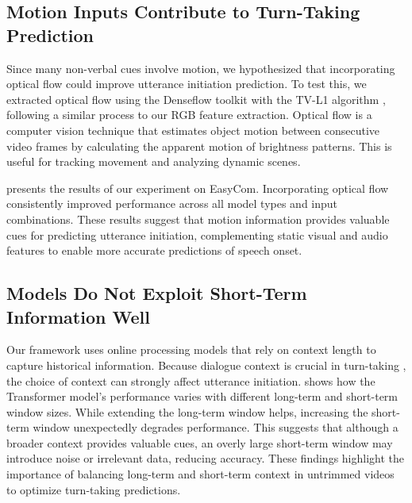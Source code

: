 






\subsection {Motion Inputs Contribute to Turn-Taking Prediction}
Since many non-verbal cues involve motion, we hypothesized that incorporating optical flow could improve utterance initiation prediction.
To test this, we extracted optical flow using the Denseflow toolkit \cite{wang2020denseflow} with the TV-L1 algorithm \cite{zach2007dualityTVL1}, following a similar process to our RGB feature extraction. Optical flow is a computer vision technique that estimates object motion between consecutive video frames by calculating the apparent motion of brightness patterns. This is useful for tracking movement and analyzing dynamic scenes.


 presents the results of our experiment on EasyCom. Incorporating optical flow consistently improved performance across all model types and input combinations.
These results suggest that motion information provides valuable cues for predicting utterance initiation, complementing static visual and audio features to enable more accurate predictions of speech onset.

\subsection{Models Do Not Exploit Short-Term Information Well}
Our framework uses online processing models that rely on context length to capture historical information. Because dialogue context is crucial in turn-taking \cite{skantze2021turnreview}, 
the choice of context can strongly affect utterance initiation.  shows how the Transformer model’s performance varies with different long-term and short-term window sizes. While extending the long-term window helps, increasing the short-term window unexpectedly degrades performance. This suggests that although a broader context provides valuable cues, an overly large short-term window may introduce noise or irrelevant data, reducing accuracy. These findings highlight the importance of balancing long-term and short-term context in untrimmed videos to optimize turn-taking predictions.



